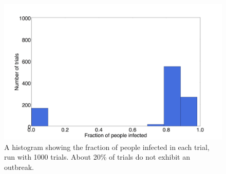 \begin{figure}
  \centering
  \includegraphics[width=.75\textwidth]{Histogram-sabd}
  \caption{A histogram showing the fraction of people infected in each trial, run with 1000 trials. About 20\% of trials do not exhibit an outbreak.}
  \label{fig:hist-sabd}
\end{figure}